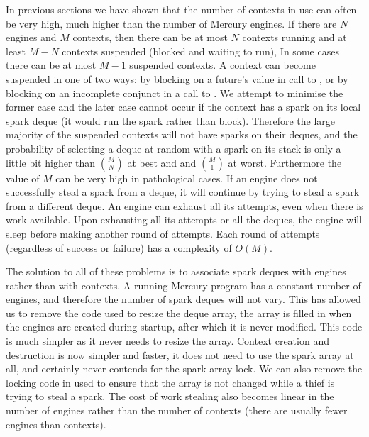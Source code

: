 \begin{description}
    In previous sections
    we have shown that the number of contexts in use can often be very high,
    much higher than the number of Mercury engines.
    If there are $N$ engines and $M$ contexts,
    then there can be at most $N$ contexts running and
    at least $M-N$ contexts suspended (blocked and waiting to run),
    In some cases there can be at most $M-1$ suspended contexts.
    A context can become suspended in one of two ways:
    by blocking on a future's value in call to \wait,
    or by blocking on an incomplete conjunct in a call to \joinandcontinue.
    We attempt to minimise the former case and the later case cannot occur
    if the context has a spark on its local spark deque (it would run the
    spark rather than block).
    Therefore the large majority of the suspended contexts will not have
    sparks on their deques,
    and the probability of selecting a deque at random with a spark on its
    stack is only a little bit higher than $M \choose N$ at best and
    and $M \choose 1$ at worst.
    Furthermore the value of $M$ can be very high in pathological cases.
    If an engine does not successfully steal a spark from a deque,
    it will continue by trying to steal a spark from a different deque.
    An engine can exhaust all its attempts, even when there is work
    available.
    Upon exhausting all its attempts or all the deques,
    the engine will sleep before making another round of attempts.
    Each round of attempts (regardless of success or failure) has a
    complexity of $O(M)$.

\end{description}

\noindent
{}
The solution to all of these problems is to associate spark deques with
engines rather than with contexts.
A running Mercury program has a constant number of engines,
and therefore the number of spark deques will not vary.
This has allowed us to remove the code used to resize the deque array,
the array is filled in when the engines are created during startup,
after which it is never modified.
This code is much simpler as it never needs to resize the array.
Context creation and destruction is now simpler and faster,
it does not need to use the spark array at all, and certainly never contends
for the spark array lock.
We can also remove the locking code in \trystealspark used to ensure that
the array is not changed while a thief is trying to steal a spark.
The cost of work stealing also becomes linear in the number of engines
rather than the number of contexts (there are usually fewer engines than
contexts).

